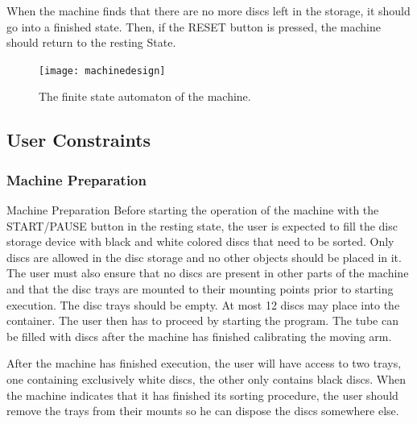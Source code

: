 \documentclass[a4paper,oneside,11pt]{article}
\begin{document}
When the machine finds that there are no more discs left in the storage, it should go into a
finished state. Then, if the RESET button is pressed, the machine should return to the resting
State.

\begin{figure}[H]
	\centering
	\texttt{[image: machinedesign]}
	\caption{\label{machinedesign}The finite state automaton of the machine.}
\end{figure}

\subsection{User Constraints}
\subsubsection{Machine Preparation}
Machine Preparation Before starting the operation of the machine with the START/PAUSE
button in the resting state, the user is expected to fill the disc storage device with black and
white colored discs that need to be sorted. Only discs are allowed in the disc storage and no
other objects should be placed in it. The user must also ensure that no discs are present in
other parts of the machine and that the disc trays are mounted to their mounting points prior
to starting execution. The disc trays should be empty. At most 12 discs may place into the
container. The user then has to proceed by starting the program. The tube can be filled with
discs after the machine has finished calibrating the moving arm.

After the machine has finished execution, the user will have access to two trays, one containing exclusively white discs, the other only contains black discs. When the machine indicates
that it has finished its sorting procedure, the user should remove the trays from their mounts
so he can dispose the discs somewhere else.
\end{document}

